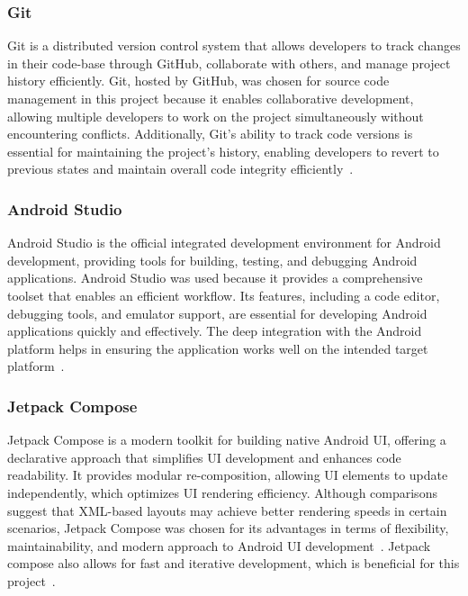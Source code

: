 \subsubsection{Git}
\label{sec:git}
Git is a distributed version control system that allows developers to track changes in their code-base through GitHub, collaborate with others, and manage project history efficiently. Git, hosted by GitHub, was chosen for source code management in this project because it enables collaborative development, allowing multiple developers to work on the project simultaneously without encountering conflicts. Additionally, Git's ability to track code versions is essential for maintaining the project's history, enabling developers to revert to previous states and maintain overall code integrity efficiently~\cite{bib:git}.

\subsubsection{Android Studio}
\label{sec:androidstudio}
Android Studio is the official integrated development environment for Android development, providing tools for building, testing, and debugging Android applications. Android Studio was used because it provides a comprehensive toolset that enables an efficient workflow. Its features, including a code editor, debugging tools, and emulator support, are essential for developing Android applications quickly and effectively. The deep integration with the Android platform helps in ensuring the application works well on the intended target platform~\cite{bib:androidstudio}.

\subsubsection{Jetpack Compose}
\label{sec:jetpackcompose}
Jetpack Compose is a modern toolkit for building native Android UI, offering a declarative approach that simplifies UI development and enhances code readability. It provides modular re-composition, allowing UI elements to update independently, which optimizes UI rendering efficiency. Although comparisons suggest that XML-based layouts may achieve better rendering speeds in certain scenarios, Jetpack Compose was chosen for its advantages in terms of flexibility, maintainability, and modern approach to Android UI development~\cite{bib:diva}. Jetpack compose also allows for fast and iterative development, which is beneficial for this project~\cite{bib:jetpackcompose}.

